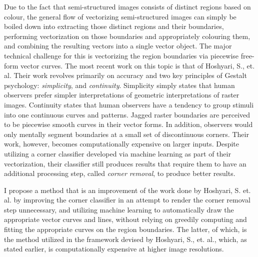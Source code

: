 Due to the fact that semi-structured images consists of distinct regions based on colour, the general flow of vectorizing semi-structured images can simply be boiled down into extracting those distinct regions and their boundaries, performing vectorization on those boundaries and appropriately colouring them, and combining the resulting vectors into a single vector object. The major technical challenge for this is vectorizing the region boundaries via piecewise free-form vector curves\cite{hoshyari2018perceptiondriven}. The most recent work on this topic is that of Hoshyari, S., et. al. Their work revolves primarily on accuracy and two key principles of Gestalt psychology: \textit{simplicity}, and \textit{continuity}. Simplicity simply states that human observers prefer simpler interpretations of geometric interpretations of raster images. Continuity states that human observers have a tendency to group stimuli into one continuous curves and patterns. Jagged raster boundaries are perceived to be piecewise smooth curves in their vector forms. In addition, observers would only mentally segment boundaries at a small set of discontinuous corners. Their work, however, becomes computationally expensive on larger inputs. Despite utilizing a corner classifier developed via machine learning as part of their vectorization, their classifier still produces results that require them to have an additional processing step, called \textit{corner removal}, to produce better results.

I propose a method that is an improvement of the work done by Hoshyari, S. et. al. by improving the corner classifier in an attempt to render the corner removal step unnecessary, and utilizing machine learning to automatically draw the appropriate vector curves and lines, without relying on greedily computing and fitting the appropriate curves on the region boundaries. The latter, of which, is the method utilized in the framework devised by Hoshyari, S., et. al., which, as stated earlier, is computationally expensive at higher image resolutions.